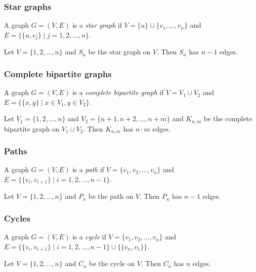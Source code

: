 \documentclass{classnotes}
\begin{document}
\subsubsection*{Star graphs}
\begin{definition}
    A graph $G=(V,E)$ is a \emph{star graph} if $V=\{u\}\cup\{v_1,\dots,v_n\}$ and $E = \{\{u,v_j\} \mid j = 1,2,\dots,n\}$.
\end{definition}
\begin{proposition}
    Let $V = \{1,2,\dots,n\}$ and $S_n$ be the star graph on $V$. Then $S_n$ has $n-1$ edges.
\end{proposition}

\subsubsection*{Complete bipartite graphs}
\begin{definition}
    A graph $G=(V,E)$ is a \emph{complete bipartite graph} if $V=V_1 \cup V_2$ and $E = \{\{x,y\} \mid x \in V_1, y \in V_2\}$.
\end{definition}
\begin{proposition}
    Let $V_1 = \{1,2,\dots,n\}$ and $V_2 = \{n+1,n+2,\dots,n+m\}$ and $K_{n,m}$ be the complete bipartite graph on $V_1 \cup V_2$. Then $K_{n,m}$ has $n \cdot m$ edges.
\end{proposition}

\subsubsection*{Paths}
\begin{definition}[Path]
    A graph $G=(V,E)$ is a \emph{path} if $V=\{v_1,v_2,\dots,v_n\}$ and $E = \{\{v_i,v_{i+1}\} \mid i = 1,2,\dots,n-1\}$.
\end{definition}
\begin{proposition}
    Let $V = \{1,2,\dots,n\}$ and $P_n$ be the path on $V$. Then $P_n$ has $n-1$ edges.
\end{proposition}

\subsubsection*{Cycles}
\begin{definition}[Cycle]
    A graph $G=(V,E)$ is a \emph{cycle} if $V=\{v_1,v_2,\dots,v_n\}$ and $E = \{\{v_i,v_{i+1}\} \mid i = 1,2,\dots,n-1\} \cup \{\{v_n,v_1\}\}$.
\end{definition}
\begin{proposition}
    Let $V = \{1,2,\dots,n\}$ and $C_n$ be the cycle on $V$. Then $C_n$ has $n$ edges.
\end{proposition}
\end{document}
